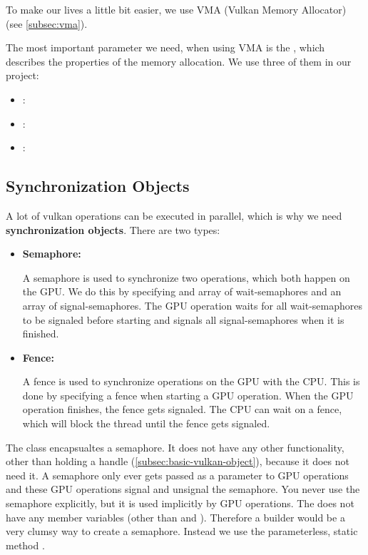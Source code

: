 To make our lives a little bit easier, we use VMA (Vulkan Memory Allocator) (see \autoref{subsec:vma}).

The most important parameter we need, when using VMA is the , which describes the properties of the memory allocation. We use three of them in our project:

\begin{itemize}
    \item {}:
    \item {}:
    \item {}:
\end{itemize}

\subsection{Synchronization Objects}\label{subsec:sync-objects}

A lot of vulkan operations can be executed in parallel, which is why we need \textbf{synchronization objects}. There are two types:

\begin{itemize}
    \item \textbf{Semaphore:}
    
    A semaphore is used to synchronize two operations, which both happen on the GPU. We do this by specifying and array of wait-semaphores and an array of signal-semaphores. The GPU operation waits for all wait-semaphores to be signaled before starting and signals all signal-semaphores when it is finished.

    \item \textbf{Fence:}
    
    A fence is used to synchronize operations on the GPU with the CPU. This is done by specifying a fence when starting a GPU operation. When the GPU operation finishes, the fence gets signaled. The CPU can wait on a fence, which will block the thread until the fence gets signaled.
\end{itemize}

The  class encapsualtes a semaphore. It does not have any other functionality, other than holding a  handle (\autoref{subsec:basic-vulkan-object}), because it does not need it. A semaphore only ever gets passed as a parameter to GPU operations and these GPU operations signal and unsignal the semaphore. You never use the semaphore explicitly, but it is used implicitly by GPU operations. The  does not have any member variables (other than  and ). Therefore a builder would be a very clumsy way to create a semaphore. Instead we use the parameterless, static method .

